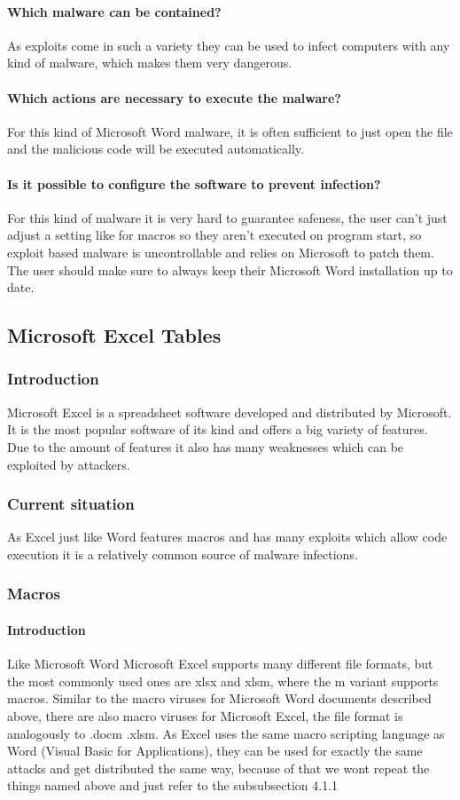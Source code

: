 \documentclass[a4paper,10pt]{article}
\begin{document}
\paragraph*{Which malware can be contained?}
As exploits come in such a variety they can be used to infect computers with any kind of malware, which makes them very dangerous.
\paragraph*{Which actions are necessary to execute the malware?}
For this kind of Microsoft Word malware, it is often sufficient to just open the file and the malicious code will be executed automatically.
\paragraph*{Is it possible to configure the software to prevent infection?}
For this kind of malware it is very hard to guarantee safeness, the user can't just adjust a setting like for macros so they aren't executed on program start, so exploit based malware is uncontrollable and relies on Microsoft to patch them. The user should make sure to always keep their Microsoft Word installation up to date.


\subsection{Microsoft Excel Tables}
\subsubsection{Introduction}
Microsoft Excel is a spreadsheet software developed and distributed by Microsoft. It is the most popular software of its kind and offers a big variety of features. Due to the amount of features it also has many weaknesses which can be exploited by attackers.

\subsubsection{Current situation}
As Excel just like Word features macros and has many exploits which allow code execution it is a relatively common source of malware infections.

\subsubsection{Macros}
\paragraph*{Introduction}
Like Microsoft Word Microsoft Excel supports many different file formats, but the most commonly used ones are xlsx and xlsm, where the m variant supports macros. Similar to the macro viruses for Microsoft Word documents described above, there are also macro viruses for Microsoft Excel, the file format is analogously to .docm .xlsm. As Excel uses the same macro scripting language as Word (Visual Basic for Applications), they can be used for exactly the same attacks and get distributed the same way, because of that we wont repeat the things named above and just refer to the subsubsection 4.1.1
\end{document}

